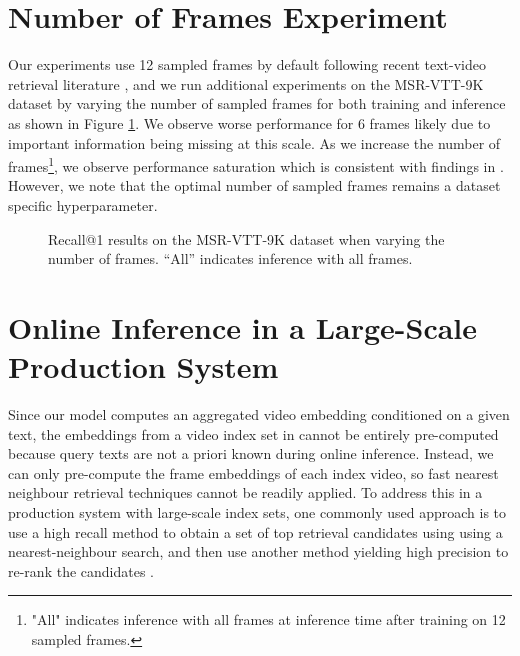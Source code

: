 \documentclass[10pt,twocolumn,letterpaper]{article}
\begin{document}
\section{Number of Frames Experiment}
Our experiments use 12 sampled frames by default following recent text-video retrieval literature \cite{luo2021clip4clip}, and we run additional experiments on the MSR-VTT-9K dataset by varying the number of sampled frames for both training and inference as shown in Figure \ref{fig:frames_exp}. We observe worse performance for 6 frames likely due to important information being missing at this scale. As we increase the number of frames\footnote{"All" indicates inference with all frames at inference time after training on 12 sampled frames.}, we observe performance saturation which is consistent with findings in \cite{luo2021clip4clip}. However, we note that the optimal number of sampled frames remains a dataset specific hyperparameter.

\begin{figure}[t]
\centering
{}
\vskip -0.3cm
\caption{ Recall@1 results on the MSR-VTT-9K dataset when varying the number of frames. ``All'' indicates inference with all frames.}
\label{fig:frames_exp}
\vskip -0.4cm
\end{figure}

\section{Online Inference in a Large-Scale Production System}
Since our model computes an aggregated video embedding conditioned on a given text, the embeddings from a video index set in  cannot be entirely pre-computed because query texts are not a priori known during online inference. Instead, we can only pre-compute the frame embeddings of each index video, so fast nearest neighbour retrieval techniques \cite{liu2004investigation, johnson2019billion} cannot be readily applied. To address this in a production system with large-scale index sets, one commonly used approach is to use a high recall method to obtain a set of top retrieval candidates using using a nearest-neighbour search, and then use another method yielding high precision to re-rank the candidates \cite{covington2016deep, ma2019cross}. 
\end{document}
